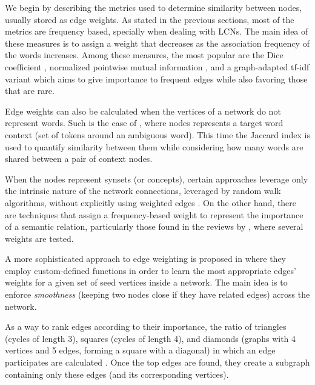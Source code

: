 We begin by describing the metrics used to determine similarity between nodes, usually stored as edge weights. As stated in the previous sections, most of the metrics are frequency based, specially when dealing with LCNs. The main idea of these measures is to assign a weight that decreases as the association frequency of the words increases. Among these measures, the most popular are the Dice  coefficient \cite{2010.Navigli.InducingWordSenses.Triangles,2011.DiMarco.Navigli.ClusteringWebSearch,2013.DiMarco.Navigli.ClusteringGraph-BasedWSI}, normalized pointwise mutual information \cite{2013.Hope.GradedWSI}, and a graph-adapted tf-idf variant \cite{2007.Tsatsaronis.WSDwithSpreading} which aims to give importance to frequent edges while also favoring those that are rare.

Edge weights can also be calculated when the vertices of a network do not represent words. Such is the case of \cite{2010.Klapaftis.WSD.WSD.HierarchicalGraphs}, where nodes represents a target word context (set of tokens around an ambiguous word). This time the Jaccard index is used to quantify similarity between them while considering how many words are shared between a pair of context nodes.

When the nodes represent synsets (or concepts), certain approaches leverage only the intrinsic nature of the network connections, leveraged by random walk algorithms, without explicitly using  weighted edges \cite{2004.Mihalcea.SemanticNetworkPageRank}. 
 On the other hand, there are techniques that assign a frequency-based weight to represent the importance of a semantic relation, particularly those found in the reviews  by \cite{2007.Sinha.Mihalcea.Unsupervised,2007.Navigli.GraphConnectivity}, where several weights are tested.

A  more sophisticated approach to edge weighting is proposed in \cite{2013.Saluja.Graph-BasedUnsupervisedLearning} where they employ  custom-defined functions in order to learn the most appropriate edges' weights for a given set of seed vertices inside a network. The main idea  is to enforce \textit{smoothness} (keeping two nodes close if they have related edges) across the network.

As a way to rank edges according to their importance, the ratio of triangles (cycles of length 3), squares (cycles of length 4), and diamonds (graphs with 4 vertices and 5 edges, forming a square with a diagonal) in which an edge participates are calculated \cite{2010.Navigli.InducingWordSenses.Triangles,2013.DiMarco.Navigli.ClusteringGraph-BasedWSI}. Once the top edges are found, they create a subgraph containing only these edges (and its corresponding vertices).

